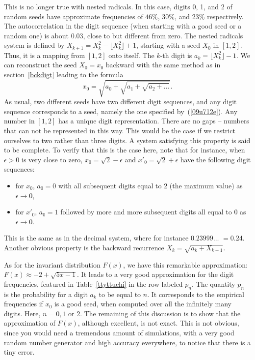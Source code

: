 \documentclass[oneside,10pt]{book}
\begin{document}
This is no longer true with nested radicals. In this case, digits 0, 1, and 2 of random seeds have approximate frequencies of
$46\%$, $30\%$, and $23\%$ respectively. The autocorrelation in the digit sequence (when starting with a good seed or a random one) is about 0.03, close to but different from zero. The nested radicals system is defined by $X_{k+1}=X_k^2 - \lfloor X_k^2 \rfloor + 1$,
  starting with a seed $X_0$ in $[1,2]$. Thus, it is a mapping from $[1, 2]$ onto itself. The $k$-th digit is $a_k =\lfloor X_k^2 \rfloor -1$.
We can reconstruct the seed $X_0 = x_0$ backward with the same method as in section~\ref{bckdigt} leading to the formula
\begin{equation}
x_0 = \sqrt{a_0 + \sqrt{a_1 + \sqrt{a_2+\dots}}}.\label{09u712e}
\end{equation}
As usual, two different seeds have two different digit sequences, and any digit sequence corresponds to a seed, namely the one specified
 by~(\ref{09u712e}). Any number in $[1,2]$ has a unique digit representation. There are no gaps -- numbers that can not be represented in this way. This would be the case if we restrict ourselves to two rather than three digits. A system satisfying
 this property is said to be \textcolor{index}{complete}. To verify that this is the case here,
 note that for instance, when $\epsilon>0$ is very close to zero, $x_0=\sqrt{2}-\epsilon$ and $x'_0=\sqrt{2}+\epsilon$ have the following
digit sequences:\vspace{1ex}
\begin{itemize}
\item for $x_0$, $a_0=0$ with all subsequent digits equal to 2 (the maximum value) as $\epsilon\rightarrow 0$,
\item for $x'_0$, $a_0=1$ followed by more and more subsequent digits all equal to 0 as $\epsilon\rightarrow 0$.
\end{itemize}\vspace{1ex}
 This is the same as in the decimal system, where for instance $0.23999\dots$ $=0.24$. Another obvious property is the backward recurrence $X_k=\sqrt{a_k +X_{k+1}}$.

As for the invariant distribution $F(x)$, we have this remarkable
approximation: $F(x) \approx -2 +\sqrt{5x-1}$. It leads to a very good approximation for the digit frequencies, featured in
 Table~\ref{ttyttuchi} in the row labeled $p_n$. The quantity $p_n$ is the probability for a digit $a_k$ to be equal to $n$. It corresponds to the empirical frequencies if $x_0$ is a good seed, when computed over all the infinitely many digits. Here, $n=0,1$ or $2$. The remaining of
 this discussion is to show that the approximation of $F(x)$, although excellent, is not exact. This is not obvious, since you would
 need a tremendous amount of simulations, with a very good random number generator and high accuracy everywhere, to notice that there is a tiny error.
\end{document}
